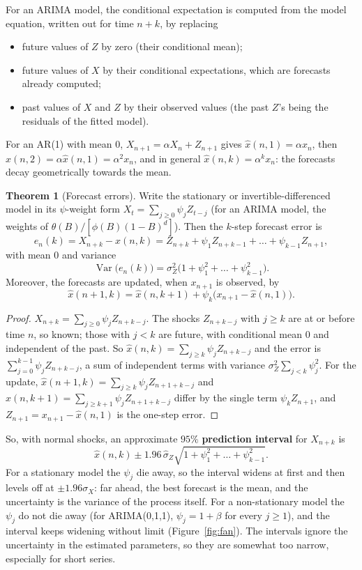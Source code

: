 \documentclass[11pt,a4paper]{article}
\theoremstyle{definition}
\newtheorem{thm}{Theorem}[subsection]
\DeclareMathOperator{\Var}{Var}
\begin{document}
For an ARIMA model, the conditional expectation is computed from the model equation, written
out for time $n + k$, by replacing
\begin{itemize}
\item future values of $Z$ by zero (their conditional mean);
\item future values of $X$ by their conditional expectations, which are forecasts already computed;
\item past values of $X$ and $Z$ by their observed values (the past $Z$'s being the residuals of the fitted model).
\end{itemize}
For an AR(1) with mean $0$, $X_{n+1} = \alpha X_n + Z_{n+1}$ gives $\hat x(n, 1) = \alpha x_n$, then $\hat x(n, 2) = \alpha\hat x(n, 1) = \alpha^2x_n$, and in general $\hat x(n, k) = \alpha^kx_n$: the
forecasts decay geometrically towards the mean.

\begin{thm}[Forecast errors]\label{thm:forecast-error}
Write the stationary or invertible-differenced model in its $\psi$-weight form $X_t = \sum_{j\ge0}\psi_jZ_{t-j}$ (for an ARIMA model, the
weights of $\theta(B)/[\phi(B)(1 - B)^d]$). Then the $k$-step forecast error is
\[
e_n(k) = X_{n+k} - \hat x(n, k) = Z_{n+k} + \psi_1Z_{n+k-1} + \dots + \psi_{k-1}Z_{n+1} ,
\]
with mean $0$ and variance
\[
\Var\bigl(e_n(k)\bigr) = \sigma_Z^2\bigl(1 + \psi_1^2 + \dots + \psi_{k-1}^2\bigr) .
\]
Moreover, the forecasts are updated, when $x_{n+1}$ is observed, by
\[
\hat x(n + 1, k) = \hat x(n, k + 1) + \psi_k\bigl(x_{n+1} - \hat x(n, 1)\bigr) .
\]
\end{thm}

\begin{proof}
$X_{n+k} = \sum_{j\ge0}\psi_jZ_{n+k-j}$. The shocks $Z_{n+k-j}$ with $j \ge k$ are at or before time $n$, so known; those with $j < k$ are future, with conditional
mean $0$ and independent of the past. So $\hat x(n, k) = \sum_{j\ge k}\psi_jZ_{n+k-j}$ and the error is $\sum_{j=0}^{k-1}\psi_jZ_{n+k-j}$, a sum of independent terms
with variance $\sigma_Z^2\sum_{j<k}\psi_j^2$. For the update, $\hat x(n + 1, k) = \sum_{j\ge k}\psi_jZ_{n+1+k-j}$ and $\hat x(n, k + 1) = \sum_{j\ge k+1}\psi_jZ_{n+1+k-j}$ differ by the single term $\psi_kZ_{n+1}$,
and $Z_{n+1} = x_{n+1} - \hat x(n, 1)$ is the one-step error.
\end{proof}

So, with normal shocks, an approximate $95\%$ \textbf{prediction interval} for $X_{n+k}$ is
\[
\hat x(n, k) \pm 1.96\,\hat\sigma_Z\sqrt{1 + \psi_1^2 + \dots + \psi_{k-1}^2} .
\]
For a stationary model the $\psi_j$ die away, so the interval widens at first and then levels off at $\pm1.96\sigma_X$: far ahead,
the best forecast is the mean, and the uncertainty is the variance of the process itself. For a
non-stationary model the $\psi_j$ do not die away (for ARIMA(0,1,1), $\psi_j = 1 + \beta$ for every $j \ge 1$), and the interval keeps widening
without limit (Figure~\ref{fig:fan}). The intervals ignore the uncertainty in the estimated parameters, so they are
somewhat too narrow, especially for short series.
\end{document}

